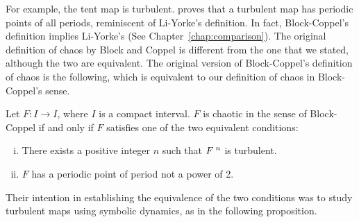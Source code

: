 \documentclass[10pt,twoside]{book}
\begin{document}
For example, the tent map is turbulent.
\citet{blockcoppel} proves that a turbulent map has periodic points of all periods, reminiscent of Li-Yorke's definition.
In fact, Block-Coppel's definition implies Li-Yorke's (See Chapter~\ref{chap:comparison}).
The original definition of chaos by Block and Coppel is different from the one that we stated, although the two are equivalent.
The original version of Block-Coppel's definition of chaos is the following, which is equivalent to our definition of chaos in Block-Coppel's sense.
\begin{theorem}
  \citep[Chap.II]{blockcoppel}
  Let $F: I \to I$, where $I$ is a compact interval.
  $F$ is chaotic in the sense of Block-Coppel if and only if $F$ satisfies one of the two equivalent conditions:
  \begin{enumerate}[(i)]
    \item There exists a positive integer $n$ such that $F^{\;n}$ is turbulent.
    \item $F$ has a periodic point of period not a power of 2.
  \end{enumerate}
  \label{thm:blcpII}
\end{theorem}
Their intention in establishing the equivalence of the two conditions was to study turbulent maps using symbolic dynamics, as in the following proposition.
\end{document}
